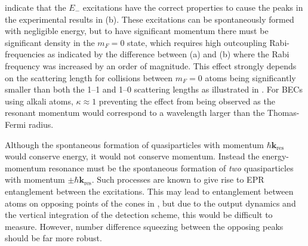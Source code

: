  indicate that the $E_-$ excitations have the correct properties to cause the peaks in the experimental results in (b). These excitations can be spontaneously formed with negligible energy, but to have significant momentum there must be significant density in the $m_F=0$ state, which requires high outcoupling Rabi-frequencies as indicated by the difference between (a) and (b) where the Rabi frequency was increased by an order of magnitude. This effect strongly depends on the scattering length for collisions between $m_F=0$ atoms being significantly smaller than both the 1--1 and 1--0 scattering lengths as illustrated in . For BECs using alkali atoms, $\kappa \approx 1$ preventing the effect from being observed as the resonant momentum would correspond to a wavelength larger than the Thomas-Fermi radius.

Although the spontaneous formation of quasiparticles with momentum $\hbar \mathbf{k}_\text{res}$ would conserve energy, it would not conserve momentum. Instead the energy-momentum resonance must be the spontaneous formation of \emph{two} quasiparticles with momentum $\pm \hbar \mathbf{k}_\text{res}$. Such processes are known to give rise to EPR entanglement between the excitations. This may lead to entanglement between atoms on opposing points of the cones in , but due to the output dynamics and the vertical integration of the detection scheme, this would be difficult to measure. However, number difference squeezing between the opposing peaks should be far more robust.

